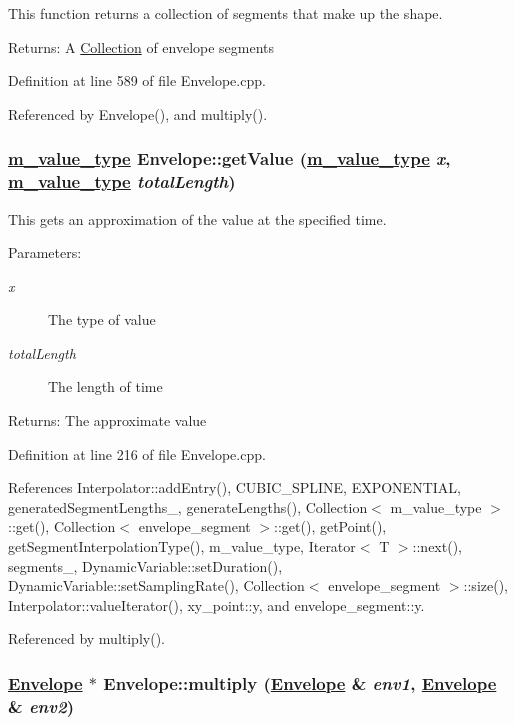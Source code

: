 This function returns a collection of segments that make up the shape. \begin{Desc}
\item[Returns:]A \hyperlink{classCollection}{Collection} of envelope segments \end{Desc}


Definition at line 589 of file Envelope.cpp.

Referenced by Envelope(), and multiply().\hypertarget{classEnvelope_a6}{
\subsubsection[getValue]{\setlength{\rightskip}{0pt plus 5cm}\hyperlink{Types_8h_a3}{m\_\-value\_\-type} Envelope::get\-Value (\hyperlink{Types_8h_a3}{m\_\-value\_\-type} {\em x}, \hyperlink{Types_8h_a3}{m\_\-value\_\-type} {\em total\-Length})}}
\label{classEnvelope_a6}


This gets an approximation of the value at the specified time. \begin{Desc}
\item[Parameters:]
\begin{description}
\item[{\em x}]The type of value \item[{\em total\-Length}]The length of time \end{description}
\end{Desc}
\begin{Desc}
\item[Returns:]The approximate value \end{Desc}


Definition at line 216 of file Envelope.cpp.

References Interpolator::add\-Entry(), CUBIC\_\-SPLINE, EXPONENTIAL, generated\-Segment\-Lengths\_\-, generate\-Lengths(), Collection$<$ m\_\-value\_\-type $>$::get(), Collection$<$ envelope\_\-segment $>$::get(), get\-Point(), get\-Segment\-Interpolation\-Type(), m\_\-value\_\-type, Iterator$<$ T $>$::next(), segments\_\-, Dynamic\-Variable::set\-Duration(), Dynamic\-Variable::set\-Sampling\-Rate(), Collection$<$ envelope\_\-segment $>$::size(), Interpolator::value\-Iterator(), xy\_\-point::y, and envelope\_\-segment::y.

Referenced by multiply().\hypertarget{classEnvelope_a11}{
\subsubsection[multiply]{\setlength{\rightskip}{0pt plus 5cm}\hyperlink{classEnvelope}{Envelope} $\ast$ Envelope::multiply (\hyperlink{classEnvelope}{Envelope} \& {\em env1}, \hyperlink{classEnvelope}{Envelope} \& {\em env2})}}
\label{classEnvelope_a11}


